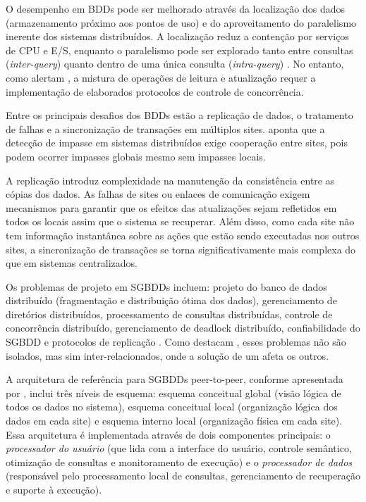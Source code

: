 O desempenho em BDDs pode ser melhorado através da localização dos dados (armazenamento próximo aos pontos de uso) e do aproveitamento do paralelismo inerente dos sistemas distribuídos. A localização reduz a contenção por serviços de CPU e E/S, enquanto o paralelismo pode ser explorado tanto entre consultas (\textit{inter-query}) quanto dentro de uma única consulta (\textit{intra-query}) . No entanto, como alertam , a mistura de operações de leitura e atualização requer a implementação de elaborados protocolos de controle de concorrência.

Entre os principais desafios dos BDDs estão a replicação de dados, o tratamento de falhas e a sincronização de transações em múltiplos sites.  aponta que a detecção de impasse em sistemas distribuídos exige cooperação entre sites, pois podem ocorrer impasses globais mesmo sem impasses locais.

A replicação introduz complexidade na manutenção da consistência entre as cópias dos dados. As falhas de sites ou enlaces de comunicação exigem mecanismos para garantir que os efeitos das atualizações sejam refletidos em todos os locais assim que o sistema se recuperar. Além disso, como cada site não tem informação instantânea sobre as ações que estão sendo executadas nos outros sites, a sincronização de transações se torna significativamente mais complexa do que em sistemas centralizados.

Os problemas de projeto em SGBDDs incluem: projeto do banco de dados distribuído (fragmentação e distribuição ótima dos dados), gerenciamento de diretórios distribuídos, processamento de consultas distribuídas, controle de concorrência distribuído, gerenciamento de deadlock distribuído, confiabilidade do SGBDD e protocolos de replicação . Como destacam , esses problemas não são isolados, mas sim inter-relacionados, onde a solução de um afeta os outros.

A arquitetura de referência para SGBDDs peer-to-peer, conforme apresentada por , inclui três níveis de esquema: esquema conceitual global (visão lógica de todos os dados no sistema), esquema conceitual local (organização lógica dos dados em cada site) e esquema interno local (organização física em cada site). Essa arquitetura é implementada através de dois componentes principais: o \textit{processador do usuário} (que lida com a interface do usuário, controle semântico, otimização de consultas e monitoramento de execução) e o \textit{processador de dados} (responsável pelo processamento local de consultas, gerenciamento de recuperação e suporte à execução).

